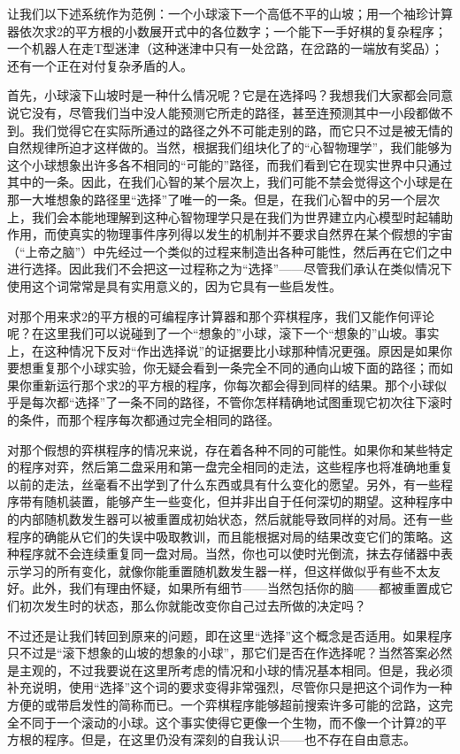 让我们以下述系统作为范例：一个小球滚下一个高低不平的山坡；用一个袖珍计算器依次求2的平方根的小数展开式中的各位数字；一个能下一手好棋的复杂程序；一个机器人在走T型迷津（这种迷津中只有一处岔路，在岔路的一端放有奖品）；还有一个正在对付复杂矛盾的人。

首先，小球滚下山坡时是一种什么情况呢？它是在选择吗？我想我们大家都会同意说它没有，尽管我们当中没人能预测它所走的路径，甚至连预测其中一小段都做不到。我们觉得它在实际所通过的路径之外不可能走别的路，而它只不过是被无情的自然规律所迫才这样做的。当然，根据我们组块化了的“心智物理学”，我们能够为这个小球想象出许多各不相同的“可能的”路径，而我们看到它在现实世界中只通过其中的一条。因此，在我们心智的某个层次上，我们可能不禁会觉得这个小球是在那一大堆想象的路径里“选择”了唯一的一条。但是，在我们心智中的另一个层次上，我们会本能地理解到这种心智物理学只是在我们为世界建立内心模型时起辅助作用，而使真实的物理事件序列得以发生的机制并不要求自然界在某个假想的宇宙（“上帝之脑”）中先经过一个类似的过程来制造出各种可能性，然后再在它们之中进行选择。因此我们不会把这一过程称之为“选择”——尽管我们承认在类似情况下使用这个词常常是具有实用意义的，因为它具有一些启发性。

对那个用来求$2$的平方根的可编程序计算器和那个弈棋程序，我们又能作何评论呢？在这里我们可以说碰到了一个“想象的”小球，滚下一个“想象的”山坡。事实上，在这种情况下反对“作出选择说”的证据要比小球那种情况更强。原因是如果你要想重复那个小球实验，你无疑会看到一条完全不同的通向山坡下面的路径；而如果你重新运行那个求$2$的平方根的程序，你每次都会得到同样的结果。那个小球似乎是每次都“选择”了一条不同的路径，不管你怎样精确地试图重现它初次往下滚时的条件，而那个程序每次都通过完全相同的路径。

对那个假想的弈棋程序的情况来说，存在着各种不同的可能性。如果你和某些特定的程序对弈，然后第二盘采用和第一盘完全相同的走法，这些程序也将准确地重复以前的走法，丝毫看不出学到了什么东西或具有什么变化的愿望。另外，有一些程序带有随机装置，能够产生一些变化，但并非出自于任何深切的期望。这种程序中的内部随机数发生器可以被重置成初始状态，然后就能导致同样的对局。还有一些程序的确能从它们的失误中吸取教训，而且能根据对局的结果改变它们的策略。这种程序就不会连续重复同一盘对局。当然，你也可以使时光倒流，抹去存储器中表示学习的所有变化，就像你能重置随机数发生器一样，但这样做似乎有些不太友好。此外，我们有理由怀疑，如果所有细节——当然包括你的脑——都被重置成它们初次发生时的状态，那么你就能改变你自己过去所做的决定吗？

不过还是让我们转回到原来的问题，即在这里“选择”这个概念是否适用。如果程序只不过是“滚下想象的山坡的想象的小球”，那它们是否在作选择呢？当然答案必然是主观的，不过我要说在这里所考虑的情况和小球的情况基本相同。但是，我必须补充说明，使用“选择”这个词的要求变得非常强烈，尽管你只是把这个词作为一种方便的或带启发性的简称而已。一个弈棋程序能够超前搜索许多可能的岔路，这完全不同于一个滚动的小球。这个事实使得它更像一个生物，而不像一个计算$2$的平方根的程序。但是，在这里仍没有深刻的自我认识——也不存在自由意志。

